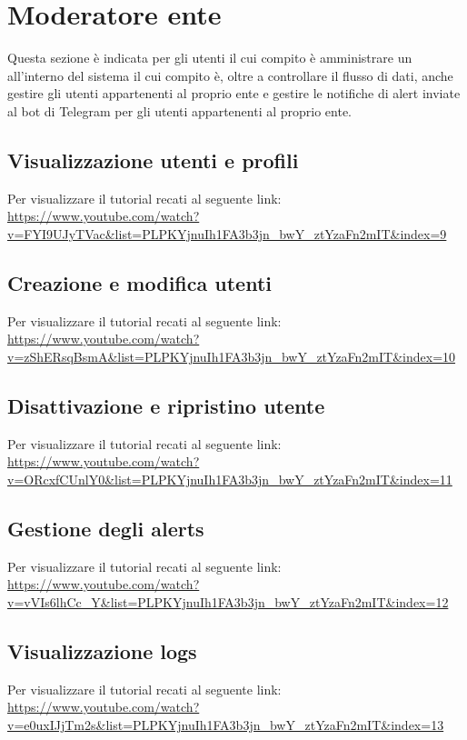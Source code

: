 \section{Moderatore ente}
Questa sezione è indicata per gli utenti il cui compito è amministrare un  all'interno del sistema il cui compito è, oltre a controllare il flusso di dati, anche gestire gli utenti appartenenti al proprio ente e gestire le notifiche di alert inviate al bot di Telegram per gli utenti appartenenti al proprio ente.

\subsection{Visualizzazione utenti e profili}
Per visualizzare il tutorial recati al seguente link: 
\url{https://www.youtube.com/watch?v=FYI9UJyTVac&list=PLPKYjnuIh1FA3b3jn_bwY_ztYzaFn2mIT&index=9}

\subsection{Creazione e modifica utenti}
Per visualizzare il tutorial recati al seguente link: 
\url{https://www.youtube.com/watch?v=zShERsqBsmA&list=PLPKYjnuIh1FA3b3jn_bwY_ztYzaFn2mIT&index=10}

\subsection{Disattivazione e ripristino utente}
Per visualizzare il tutorial recati al seguente link: 
\url{https://www.youtube.com/watch?v=ORcxfCUnlY0&list=PLPKYjnuIh1FA3b3jn_bwY_ztYzaFn2mIT&index=11}

\subsection{Gestione degli alerts}
Per visualizzare il tutorial recati al seguente link: 
\url{https://www.youtube.com/watch?v=vVIs6lhCc_Y&list=PLPKYjnuIh1FA3b3jn_bwY_ztYzaFn2mIT&index=12}

\subsection{Visualizzazione logs}
Per visualizzare il tutorial recati al seguente link: 
\url{https://www.youtube.com/watch?v=e0uxIJjTm2s&list=PLPKYjnuIh1FA3b3jn_bwY_ztYzaFn2mIT&index=13}
